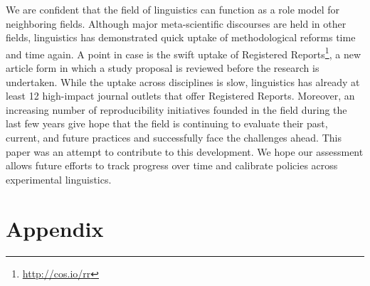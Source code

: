 \documentclass[cm,linguex]{glossa}
\begin{document}
We are confident that the field of linguistics can function as a role model for neighboring fields. Although major meta-scientific discourses are held in other fields, linguistics has demonstrated quick uptake of methodological reforms time and time again. A point in case is the swift uptake of Registered Reports\footnote{\url{http://cos.io/rr}}, a new article form in which a study proposal is reviewed before the research is undertaken. While the uptake across disciplines is slow, linguistics has already at least 12 high-impact journal outlets that offer Registered Reports. Moreover, an increasing number of reproducibility initiatives founded in the field during the last few years give hope that the field is continuing to evaluate their past, current, and future practices and successfully face the challenges ahead. This paper was an attempt to contribute to this development. We hope our assessment allows future efforts to track progress over time and calibrate policies across experimental linguistics.

\hypertarget{appendix}{%
\section*{Appendix}\label{appendix}}

\providecommand{\docline}[3]{\noalign{\global\setlength{\arrayrulewidth}{#1}}\arrayrulecolor[HTML]{#2}\cline{#3}}

\setlength{\tabcolsep}{2pt}

\renewcommand*{\arraystretch}{1.5}
\end{document}
